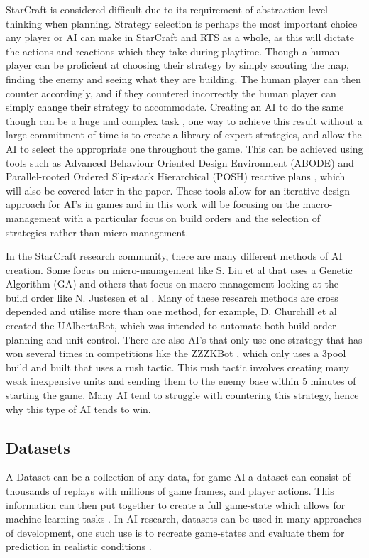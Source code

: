 \documentclass[journal]{IEEEtran}
\begin{document}
StarCraft is considered difficult due to its requirement of abstraction level thinking when planning. Strategy selection is perhaps the most important choice any player or AI can make in StarCraft and RTS as a whole, as this will dictate the actions and reactions which they take during playtime. Though a human player can be proficient at choosing their strategy by simply scouting the map, finding the enemy and seeing what they are building. The human player can then counter accordingly, and if they countered incorrectly the human player can simply change their strategy to accommodate. Creating an AI to do the same though can be a huge and complex task \cite{Fuzzy,OnlineEvo,GoalDriven}, one way to achieve this result without a large commitment of time is to create a library of expert strategies, and allow the AI to select the appropriate one throughout the game. This can be achieved using tools such as Advanced Behaviour Oriented Design Environment (ABODE) and Parallel-rooted Ordered Slip-stack Hierarchical (POSH) reactive plans \cite{POSH}, which will also be covered later in the paper. These tools allow for an iterative design approach for AI's in games and in this work will be focusing on the macro-management with a particular focus on build orders and the selection of strategies rather than micro-management. 

In the StarCraft research community, there are many different methods of AI creation. Some focus on micro-management like S. Liu et al \cite{EffectiveMicro} that uses a Genetic Algorithm (GA) and others that focus on macro-management looking at the build order like N. Justesen et al \cite{OnlineEvo}. Many of these research methods are cross depended and utilise more than one method, for example, D. Churchill et al \cite{Agents} created the UAlbertaBot, which was intended to automate both build order planning and unit control. There are also AI's that only use one strategy that has won several times in competitions like the ZZZKBot \cite{ZZZK,Results}, which only uses a 3pool build and built that uses a rush tactic. This rush tactic involves creating many weak inexpensive units and sending them to the enemy base within 5 minutes of starting the game. Many AI tend to struggle with countering this strategy, hence why this type of AI tends to win.

\subsection{Datasets}
A Dataset can be a collection of any data, for game AI a dataset can consist of thousands of replays with millions of game frames, and player actions\cite{Dataset}. This information can then put together to create a full game-state which allows for machine learning tasks \cite{Dataset17}. In AI research, datasets can be used in many approaches of development, one such use is to recreate game-states and evaluate them for prediction in realistic conditions \cite{SpecialTactics}.
\end{document}
